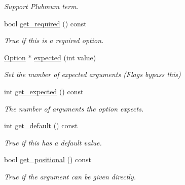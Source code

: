 \begin{DoxyCompactItemize}
\begin{DoxyCompactList}\small\item\em Support Plubmum term. \end{DoxyCompactList}\item 
\mbox{\label{class_c_l_i_1_1_option_a1b1aaa271902bca28a2c526d015a93c1}} 
bool \hyperlink{class_c_l_i_1_1_option_a1b1aaa271902bca28a2c526d015a93c1}{get\+\_\+required} () const
\begin{DoxyCompactList}\small\item\em True if this is a required option. \end{DoxyCompactList}\item 
\mbox{\label{class_c_l_i_1_1_option_af75c26433baa09c7c762bfb9eb466215}} 
\hyperlink{class_c_l_i_1_1_option}{Option} $\ast$ \hyperlink{class_c_l_i_1_1_option_af75c26433baa09c7c762bfb9eb466215}{expected} (int value)
\begin{DoxyCompactList}\small\item\em Set the number of expected arguments (Flags bypass this) \end{DoxyCompactList}\item 
\mbox{\label{class_c_l_i_1_1_option_a307543e6e4ddeb6e4ea00438b5b10be3}} 
int \hyperlink{class_c_l_i_1_1_option_a307543e6e4ddeb6e4ea00438b5b10be3}{get\+\_\+expected} () const
\begin{DoxyCompactList}\small\item\em The number of arguments the option expects. \end{DoxyCompactList}\item 
\mbox{\label{class_c_l_i_1_1_option_a26527442a386c8ccc369069c00062398}} 
int \hyperlink{class_c_l_i_1_1_option_a26527442a386c8ccc369069c00062398}{get\+\_\+default} () const
\begin{DoxyCompactList}\small\item\em True if this has a default value. \end{DoxyCompactList}\item 
\mbox{\label{class_c_l_i_1_1_option_acab7033604b49e314d290b01adea690d}} 
bool \hyperlink{class_c_l_i_1_1_option_acab7033604b49e314d290b01adea690d}{get\+\_\+positional} () const
\begin{DoxyCompactList}\small\item\em True if the argument can be given directly. \end{DoxyCompactList}\item 

\end{DoxyCompactItemize}

